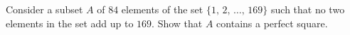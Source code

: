 Consider a subset $A$ of $84$ elements of the set $\{1,\,2,\,\dots,\,169\}$ such that no two elements in the set add up to $169$. Show that $A$ contains a perfect square.